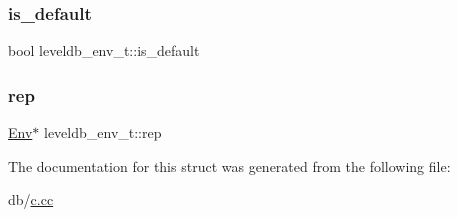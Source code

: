 \subsubsection{\texorpdfstring{is\_default}{is\_default}}
{\footnotesize\ttfamily bool leveldb\+\_\+env\+\_\+t\+::is\+\_\+default}

\mbox{\label{structleveldb__env__t_ad41038b41aebaf7ffba1a4bbfaa8b539}} 
\subsubsection{\texorpdfstring{rep}{rep}}
{\footnotesize\ttfamily \mbox{\hyperlink{classleveldb_1_1_env}{Env}}$\ast$ leveldb\+\_\+env\+\_\+t\+::rep}



The documentation for this struct was generated from the following file\+:\begin{DoxyCompactItemize}
\item 
db/\mbox{\hyperlink{c_8cc}{c.\+cc}}\end{DoxyCompactItemize}
